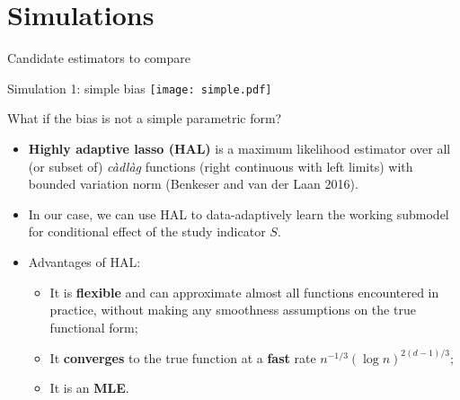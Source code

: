 \documentclass[t]{beamer}
\begin{document}
\section{Simulations}

\begin{frame}{Candidate estimators to compare}
\footnotesize
\begin{table}[]
\end{table}
\end{frame}

\begin{frame}{Simulation 1: simple bias}
\centering
\vspace{1cm}
\texttt{[image: simple.pdf]}
\end{frame}

\begin{frame}{What if the bias is not a simple parametric form?}
\begin{itemize}
\item \textbf{Highly adaptive lasso (HAL)} is a maximum likelihood estimator over all (or subset of) \textit{càdlàg} functions (right continuous with left limits) with bounded variation norm (Benkeser and van der Laan 2016).
\item In our case, we can use HAL to data-adaptively learn the working submodel for conditional effect of the study indicator $S$.
\item Advantages of HAL: 
\begin{itemize}
\item It is \textbf{flexible} and can approximate almost all functions encountered in practice, without making any smoothness assumptions on the true functional form;
\item It \textbf{converges} to the true function at a \textbf{fast} rate $n^{-1/3}(\log n)^{2(d-1)/3}$;
\item It is an \textbf{MLE}.
\end{itemize}
\end{itemize}
\end{frame}
\end{document}
